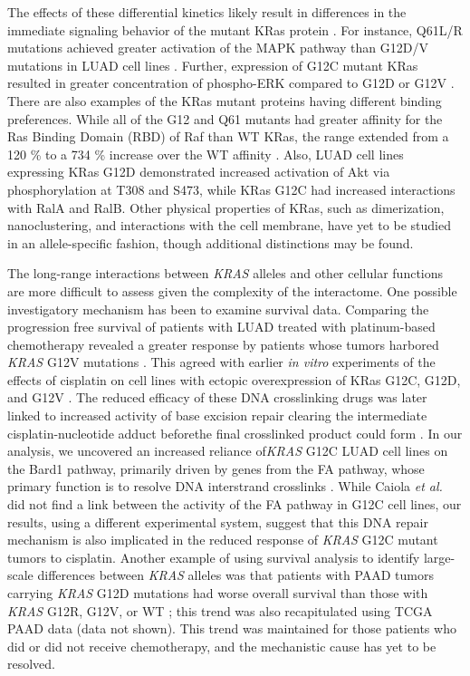 \documentclass[english, 10pt, letterpaper]{article}
\newcommand{\KRAS}{\emph{KRAS}}
\newcommand{\kras}{KRas}
\begin{document}
The effects of these differential kinetics likely result in differences in the immediate signaling behavior of the mutant \kras{} protein \cite{Haigis2017, Li2018}.
For instance, Q61L/R mutations achieved greater activation of the MAPK pathway than G12D/V mutations in LUAD cell lines \cite{Pershing2015}.
Further, expression of G12C mutant \kras{} resulted in greater concentration of phospho-ERK compared to G12D or G12V \cite{Li2018AssessingCancer.}.
There are also examples of the \kras{} mutant proteins having different binding preferences.
While all of the G12 and Q61 mutants had greater affinity for the Ras Binding Domain (RBD) of Raf than WT \kras{}, the range extended from a 120 \% to a 734 \% increase over the WT affinity \cite{Hunter2015a}.
Also, LUAD cell lines expressing \kras{} G12D demonstrated increased activation of Akt via phosphorylation at T308 and S473, while \kras{} G12C had increased interactions with RalA and RalB.
Other physical properties of \kras{}, such as dimerization, nanoclustering, and interactions with the cell membrane, have yet to be studied in an allele-specific fashion, though additional distinctions may be found.

The long-range interactions between \KRAS{} alleles and other cellular functions are more difficult to assess given the complexity of the interactome.
One possible investigatory mechanism has been to examine survival data.
Comparing the progression free survival of patients with LUAD treated with platinum-based chemotherapy revealed a greater response by patients whose tumors harbored \KRAS{} G12V mutations \cite{Cserepes2014Subtype-specificChemotherapy., Marabese2015KRASChemotherapy.}.
This agreed with earlier \emph{in vitro} experiments of the effects of cisplatin on cell lines with ectopic overexpression of \kras{} G12C, G12D, and G12V \cite{Garassino2011DifferentCancer.}.
The reduced efficacy of these DNA crosslinking drugs was later linked to increased activity of base excision repair clearing the intermediate cisplatin-nucleotide adduct beforethe final crosslinked product could form \cite{Caiola2015BaseCells.}.
In our analysis, we uncovered an increased reliance of\KRAS{} G12C LUAD cell lines on the Bard1 pathway, primarily driven by genes from the FA pathway, whose primary function is to resolve DNA interstrand crosslinks \cite{Ceccaldi2016TheFunctions.}.
While Caiola \emph{et al.} did not find a link between the activity of the FA pathway in G12C cell lines, our results, using a different experimental system, suggest that this DNA repair mechanism is also implicated in the reduced response of \KRAS{} G12C mutant tumors to cisplatin.
Another example of using survival analysis to identify large-scale differences between \KRAS{} alleles was that patients with PAAD tumors carrying \KRAS{} G12D mutations had worse overall survival than those with \KRAS{} G12R, G12V, or WT \cite{Bournet2016}; this trend was also recapitulated using TCGA PAAD data (data not shown).
This trend was maintained for those patients who did or did not receive chemotherapy, and the mechanistic cause has yet to be resolved.
\end{document}
